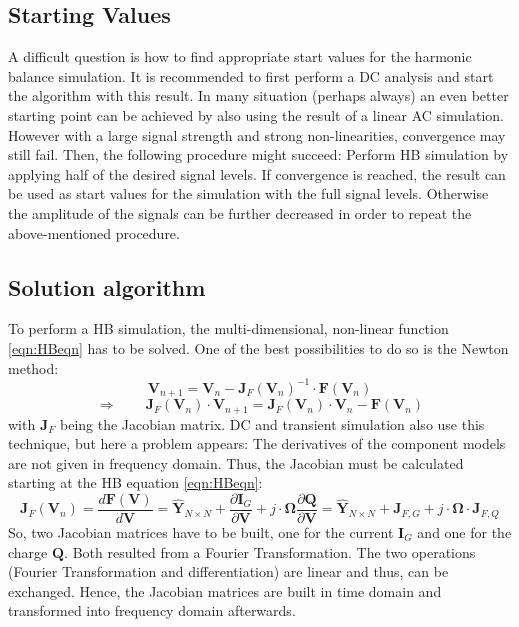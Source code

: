 \subsection{Starting Values}

A difficult question is how to find appropriate start values for the
harmonic balance simulation. It is recommended to first perform a DC
analysis and start the algorithm with this result. In many situation
(perhaps always) an even better starting point can be achieved by
also using the result of a linear AC simulation. However with a large
signal strength and strong non-linearities, convergence may still
fail. Then, the following procedure might succeed: Perform HB
simulation by applying half of the desired signal levels. If convergence
is reached, the result can be used as start values for the simulation
with the full signal levels. Otherwise the amplitude of the signals can
be further decreased in order to repeat the above-mentioned procedure.


\subsection{Solution algorithm}

To perform a HB simulation, the multi-dimensional, non-linear function
\ref{eqn:HBeqn} has to be solved. One of the best possibilities to
do so is the Newton method:
\begin{equation}
\textbf{V}_{n+1} = \textbf{V}_n - \textbf{J}_F (\textbf{V}_n)^{-1}
                   \cdot \textbf{F} (\textbf{V}_n)
\end{equation}
\begin{equation}
\label{eqn:HBnewton}
\Rightarrow \qquad \textbf{J}_F (\textbf{V}_n) \cdot \textbf{V}_{n+1}
    = \textbf{J}_F (\textbf{V}_n) \cdot \textbf{V}_n - \textbf{F} (\textbf{V}_n)
\end{equation}
with $\textbf{J}_F$ being the Jacobian matrix. DC and transient
simulation also use this technique, but here a problem appears:
The derivatives of the component models are not given in frequency
domain. Thus, the Jacobian must be calculated starting at the HB
equation \ref{eqn:HBeqn}:
\begin{equation}
\label{eqn:HBjacobi}
\boldsymbol{J}_F (\boldsymbol{V}_n) = \frac{d\boldsymbol{F} (\boldsymbol{V})}{d\boldsymbol{V}}
    = \boldsymbol{\hat{Y}}_{N \times N} + \frac{\partial \boldsymbol{I}_G}{\partial \boldsymbol{V}}
     + j\cdot \boldsymbol{\Omega}\frac{\partial \boldsymbol{Q}}{\partial \boldsymbol{V}}
    = \boldsymbol{\hat{Y}}_{N \times N} + \boldsymbol{J}_{F,G}
     + j\cdot \boldsymbol{\Omega}\cdot\boldsymbol{J}_{F,Q}
\end{equation}
So, two Jacobian matrices have to be built, one for the current
$\boldsymbol{I}_G$ and one for the charge $\boldsymbol{Q}$. Both resulted
from a Fourier Transformation. The two operations (Fourier Transformation
and differentiation) are linear and thus, can be exchanged. Hence, the
Jacobian matrices
are built in time domain and transformed into frequency domain afterwards.

